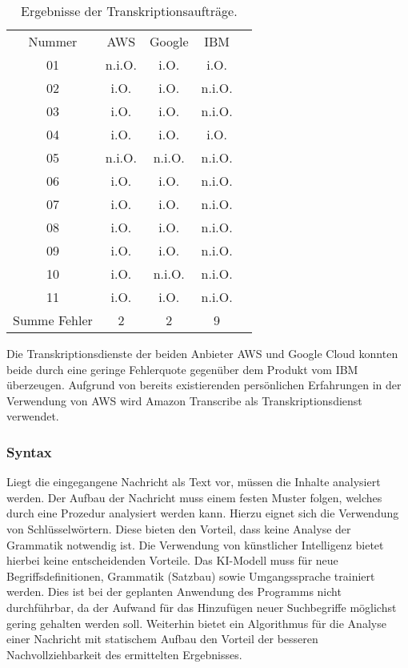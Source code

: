 \begin{table}[hb!]
\centering
\begin{tabular}{ccccc}
Nummer 		& AWS	& Google		& IBM \\
01			& n.i.O.	& i.O.		& i.O. \\
02			& i.O.	& i.O.		& n.i.O. \\
03			& i.O.	& i.O.		& n.i.O. \\
04			& i.O.	& i.O.		& i.O. \\
05			& n.i.O.	& n.i.O.		& n.i.O. \\
06			& i.O.	& i.O.		& n.i.O. \\
07			& i.O.	& i.O.		& n.i.O. \\
08			& i.O.	& i.O.		& n.i.O. \\
09			& i.O.	& i.O.		& n.i.O. \\
10			& i.O.	& n.i.O.		& n.i.O. \\
11			& i.O.	& i.O.		& n.i.O. \\
\hline
Summe Fehler	& 2		& 2			& 9
\end{tabular}
\caption{Ergebnisse der Transkriptionsaufträge.}
\label{tab:erg-transkript}
\end{table}

\FloatBarrier

Die Transkriptionsdienste der beiden Anbieter AWS und Google Cloud konnten beide durch eine geringe Fehlerquote gegenüber dem Produkt vom IBM überzeugen. Aufgrund von bereits existierenden persönlichen Erfahrungen in der Verwendung von AWS wird Amazon Transcribe als Transkriptionsdienst verwendet.

\subsubsection{Syntax}
\label{sec:syntax}

Liegt die eingegangene Nachricht als Text vor, müssen die Inhalte analysiert werden. Der Aufbau der Nachricht muss einem festen Muster folgen, welches durch eine Prozedur analysiert werden kann. Hierzu eignet sich die Verwendung von Schlüsselwörtern. Diese bieten den Vorteil, dass keine Analyse der Grammatik notwendig ist. Die Verwendung von künstlicher Intelligenz bietet hierbei keine entscheidenden Vorteile. Das KI-Modell muss für neue Begriffsdefinitionen, Grammatik (Satzbau) sowie Umgangssprache trainiert werden. Dies ist bei der geplanten Anwendung des Programms nicht durchführbar, da der Aufwand für das Hinzufügen neuer Suchbegriffe möglichst gering gehalten werden soll. Weiterhin bietet ein Algorithmus für die Analyse einer Nachricht mit statischem Aufbau den Vorteil der besseren Nachvollziehbarkeit des ermittelten Ergebnisses.

